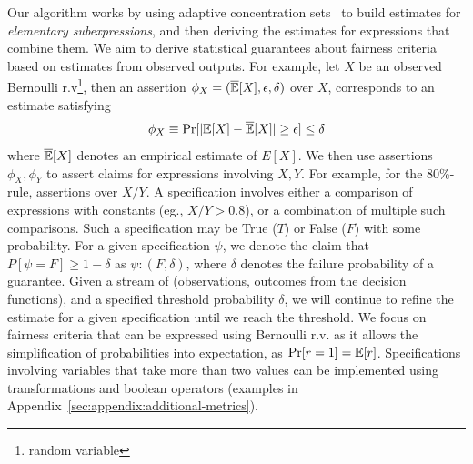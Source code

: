 Our algorithm works by using adaptive concentration sets~\citep{zhao2016adaptive,howard2021time} to build estimates for \textit{elementary subexpressions}, and then deriving the estimates for expressions that combine them.
We aim to derive statistical guarantees about fairness criteria based on estimates from observed outputs.
For example, let $X$ be an observed Bernoulli r.v\footnote{random variable}, then an assertion $\phi_X = (\overline{\mathbb{E}}[X], \epsilon, \delta)$ over $X$, corresponds to an estimate satisfying
\begin{equation}\label{eqn:eps-delta-defn}
  \phi_X \equiv \Pr[|\mathbb{E}[X] - \overline{\mathbb{E}}[X]| \geq \epsilon] \leq \delta  
\end{equation}
where $\overline{\mathbb{E}}[X]$ denotes an empirical estimate of $E[X]$.
We then use assertions $\phi_X, \phi_Y$ to assert claims for expressions involving $X, Y$.
For example, for the 80\%-rule, assertions over $X/Y$.
A specification involves either a comparison of expressions with constants (eg., $X/Y > 0.8$), or a combination of multiple such comparisons. 
Such a specification may be True ($T$) or False ($F$) with some probability.
For a given specification $\psi$, we denote the claim that $P[\psi = F] \geq 1 - \delta$ as $\psi: (F, \delta)$, where $\delta$ denotes the failure probability of a guarantee. 
Given a stream of (observations, outcomes from the decision functions), and a specified threshold probability $\delta$, we will continue to refine the estimate for a given specification until we reach the threshold.
We focus on fairness criteria that can be expressed using Bernoulli r.v. as it allows the simplification of probabilities into expectation, as $\Pr[r = 1] = \mathbb{E}[r]$.
Specifications involving variables that take more than two values can be implemented using transformations and boolean operators (examples in Appendix~\ref{sec:appendix:additional-metrics}).

